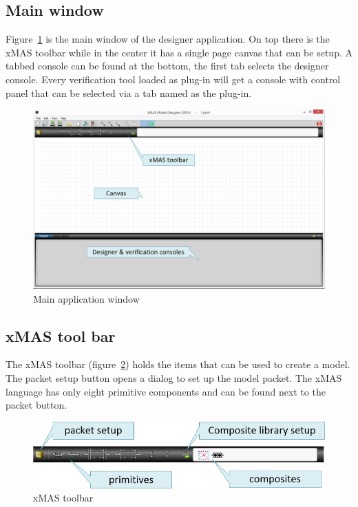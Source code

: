 \subsection{Main window}
Figure~\ref{fig:mainwindow} is the main window of the designer application. On
top there is the xMAS toolbar while in the center it has a single page canvas
that can be setup. A tabbed console can be found at the bottom, the first tab
selects the designer console. Every verification tool loaded as plug-in will get a
console with control panel that can be selected via a tab named as the plug-in.

\begin{figure}[here]
\begin{center}	
	\includegraphics[width=.70\linewidth]{pictures/xmd-empty}
	\caption{Main application window}
	\label{fig:mainwindow}
\end{center}
\end{figure}

\subsection{xMAS tool bar}
The xMAS toolbar (figure~\ref{fig:xmas-toolbar}) holds the items that can be
used to create a model. The packet setup button opens a dialog to set up the
model packet. The xMAS language has only eight primitive components and can be
found next to the packet button. 

\begin{figure}[here]
\begin{center}	
	\includegraphics[width=.70\linewidth]{pictures/xmas-toolbar}
	\caption{xMAS toolbar}
	\label{fig:xmas-toolbar}
\end{center}
\end{figure}

